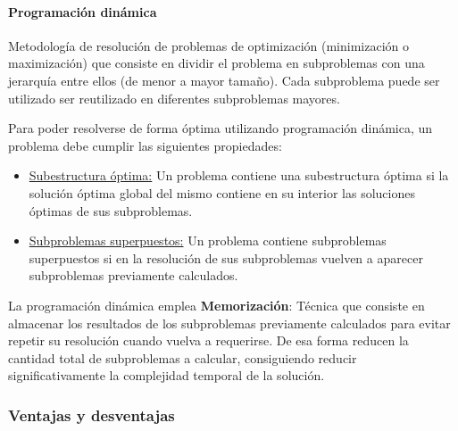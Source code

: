 \documentclass[../tp2_grupo404.tex]{subfiles}
\begin{document}
\paragraph{Programación dinámica}
Metodología de resolución de problemas de
optimización (minimización o maximización) que consiste en dividir el
problema en subproblemas con una jerarquía entre ellos (de menor a
mayor tamaño). Cada subproblema puede ser utilizado ser reutilizado en
diferentes subproblemas mayores.
\par Para poder resolverse de forma óptima utilizando programación
dinámica, un problema debe cumplir las siguientes propiedades:
\begin{itemize}
    \item \underline{Subestructura óptima:} Un problema contiene una subestructura
    óptima si la solución óptima global del mismo contiene en su interior
    las soluciones óptimas de sus subproblemas.

    \item \underline{Subproblemas superpuestos:} Un problema contiene subproblemas
    superpuestos si en la resolución de sus subproblemas vuelven a
    aparecer subproblemas previamente calculados.
\end{itemize}
La programación dinámica emplea \textbf{Memorización}: Técnica que consiste
en almacenar los resultados de los subproblemas previamente calculados para
evitar repetir su resolución cuando vuelva a requerirse. De esa forma
reducen la cantidad total de subproblemas a calcular, consiguiendo
reducir significativamente la complejidad temporal de la solución.

\subsubsection{Ventajas y desventajas}

\end{document}
